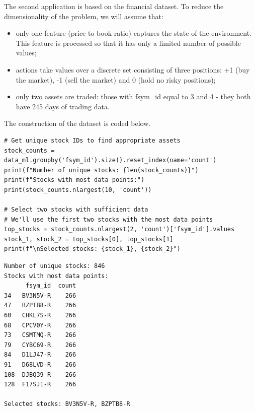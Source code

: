 The second application is based on the financial dataset. To reduce the dimensionality of the problem, we will assume that:

\begin{itemize}
\item only one feature (price-to-book ratio) captures the state of the environment. This feature is processed so that it has only a limited number of possible values;
\item actions take values over a discrete set consisting of three positions: +1 (buy the market), -1 (sell the market) and 0 (hold no risky positions);
\item only two assets are traded: those with fsym\_id equal to 3 and 4 - they both have 245 days of trading data.
\end{itemize}

The construction of the dataset is coded below.

\begin{verbatim}
# Get unique stock IDs to find appropriate assets
stock_counts = data_ml.groupby('fsym_id').size().reset_index(name='count')
print(f"Number of unique stocks: {len(stock_counts)}")
print(f"Stocks with most data points:")
print(stock_counts.nlargest(10, 'count'))

# Select two stocks with sufficient data
# We'll use the first two stocks with the most data points
top_stocks = stock_counts.nlargest(2, 'count')['fsym_id'].values
stock_1, stock_2 = top_stocks[0], top_stocks[1]
print(f"\nSelected stocks: {stock_1}, {stock_2}")
\end{verbatim}

\begin{verbatim}
Number of unique stocks: 846
Stocks with most data points:
      fsym_id  count
34   BV3N5V-R    266
47   BZPTB8-R    266
60   CHKL7S-R    266
68   CPCV0Y-R    266
73   CSMTMQ-R    266
79   CYBC69-R    266
84   D1LJ47-R    266
91   D68LVD-R    266
108  DJBQ39-R    266
128  F17SJ1-R    266

Selected stocks: BV3N5V-R, BZPTB8-R
\end{verbatim}

